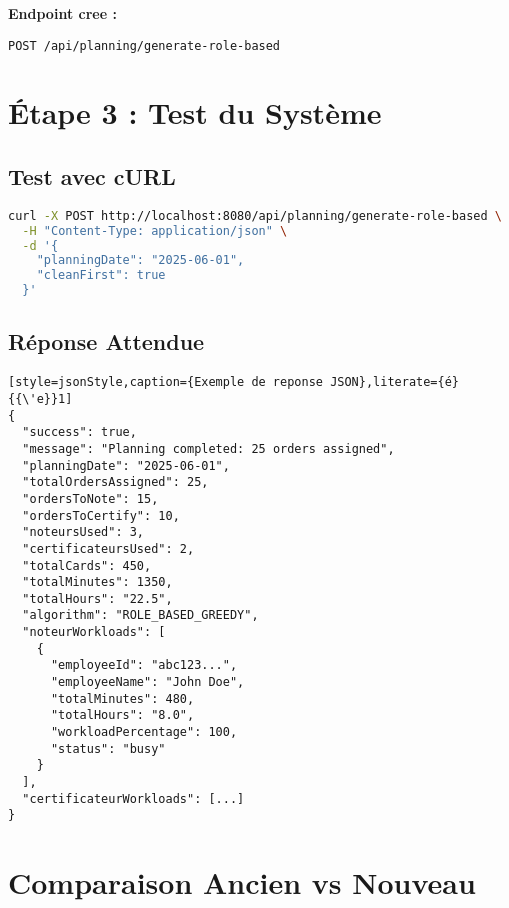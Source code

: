 \documentclass[11pt,a4paper]{article}
\begin{document}
    \textbf{Endpoint cree :}
    \begin{center}
        \texttt{POST /api/planning/generate-role-based}
    \end{center}

    \section{Étape 3 : Test du Système}

    \subsection{Test avec cURL}

    \begin{lstlisting}[style=javastyle,language=bash]
curl -X POST http://localhost:8080/api/planning/generate-role-based \
  -H "Content-Type: application/json" \
  -d '{
    "planningDate": "2025-06-01",
    "cleanFirst": true
  }'
    \end{lstlisting}

    \subsection{Réponse Attendue}

    \begin{lstlisting}[style=jsonStyle,caption={Exemple de reponse JSON},literate={é}{{\'e}}1]
{
  "success": true,
  "message": "Planning completed: 25 orders assigned",
  "planningDate": "2025-06-01",
  "totalOrdersAssigned": 25,
  "ordersToNote": 15,
  "ordersToCertify": 10,
  "noteursUsed": 3,
  "certificateursUsed": 2,
  "totalCards": 450,
  "totalMinutes": 1350,
  "totalHours": "22.5",
  "algorithm": "ROLE_BASED_GREEDY",
  "noteurWorkloads": [
    {
      "employeeId": "abc123...",
      "employeeName": "John Doe",
      "totalMinutes": 480,
      "totalHours": "8.0",
      "workloadPercentage": 100,
      "status": "busy"
    }
  ],
  "certificateurWorkloads": [...]
}
    \end{lstlisting}

    \section{Comparaison Ancien vs Nouveau}
\end{document}
